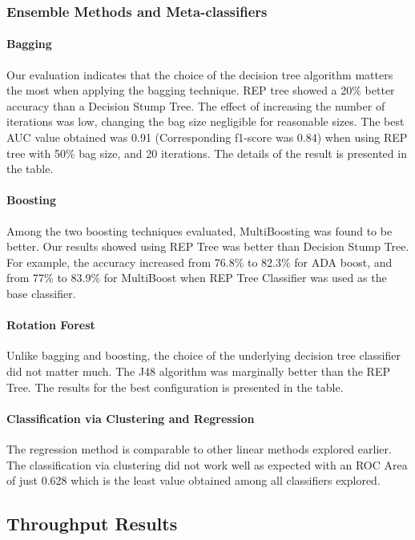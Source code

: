\subsubsection{Ensemble Methods and Meta-classifiers}

\paragraph{Bagging}

Our evaluation indicates that the choice of the decision tree algorithm matters the most when applying the bagging technique. REP tree showed a 20\% better accuracy than a Decision Stump Tree. The effect of increasing the number of iterations was low, changing the bag size negligible for reasonable sizes. The best AUC value obtained was 0.91 (Corresponding f1-score was 0.84) when using REP tree with 50\% bag size, and 20 iterations. The details of the result is presented in the table.

\paragraph{Boosting}

Among the two boosting techniques evaluated, MultiBoosting was found to be better. Our results showed using REP Tree was better than Decision Stump Tree. For example, the accuracy increased from 76.8\% to 82.3\% for ADA boost, and from 77\% to 83.9\% for MultiBoost when REP Tree Classifier was used as the base classifier.

\paragraph{Rotation Forest}

Unlike bagging and boosting, the choice of the underlying decision tree classifier did not matter much. The J48 algorithm was marginally better than the REP Tree. The results for the best configuration is presented in the table.

\paragraph{Classification via Clustering and Regression}
The regression method is comparable to other linear methods explored earlier. The classification via clustering did not work well as expected with an ROC Area of just 0.628 which is the least value obtained among all classifiers explored.


\subsection{Throughput Results}

